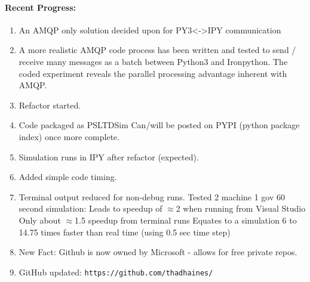 \documentclass[12pt]{article}
\begin{document}
	\paragraph{Recent Progress:}
	\begin{enumerate}
		\item An AMQP only solution decided upon for PY3<->IPY communication

		\item A more realistic AMQP code process has been written and tested to send / receive many messages as a batch between Python3 and Ironpython. The coded experiment reveals the parallel processing advantage inherent with AMQP. 

		\item Refactor started.

		\item Code packaged as PSLTDSim 
		\subitem Can/will be posted on PYPI (python package index) once more complete.

		\item Simulation runs in IPY after refactor (expected).

		\item Added simple code timing.

		\item Terminal output reduced for non-debug runs. Tested 2 machine 1 gov 60 second simulation:
		\subitem Leads to speedup of $\approx$2 when running from Visual Studio
		\subitem Only about $\approx$1.5 speedup from terminal runs
		\subitem Equates to a simulation 6 to 14.75 times faster than real time (using 0.5 sec time step)
		
		\item New Fact: Github is now owned by Microsoft - allows for free private repos.

		\item GitHub updated:
		\subitem \verb|https://github.com/thadhaines/|
		
	\end{enumerate}
\end{document}
